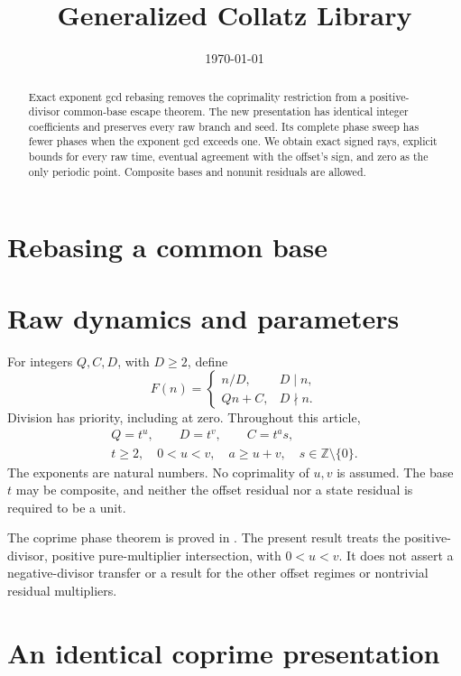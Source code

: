 \documentclass[11pt,letterpaper]{article}
\title{Generalized Collatz Library}
\author{}
\date{\today}
\newcommand{\Z}{\mathbb{Z}}
\begin{document}
\maketitle
\section*{Rebasing a common base}

\begin{abstract}
Exact exponent gcd rebasing removes the coprimality restriction from a
positive-divisor common-base escape theorem. The new presentation has identical
integer coefficients and preserves every raw branch and seed. Its complete
phase sweep has fewer phases when the exponent gcd exceeds one. We obtain
exact signed rays, explicit bounds for every raw time, eventual agreement with
the offset's sign, and zero as the only periodic point. Composite bases and
nonunit residuals are allowed.
\end{abstract}

\section{Raw dynamics and parameters}

For integers \(Q,C,D\), with \(D\ge2\), define
\[
F(n)=
\begin{cases}
n/D,&D\mid n,\\
Qn+C,&D\nmid n.
\end{cases}
\]
Division has priority, including at zero. Throughout this article,
\begin{equation}\label{Parameters}
\begin{gathered}
Q=t^u,\qquad D=t^v,\qquad C=t^a s,\\
t\ge2,\quad 0<u<v,\quad a\ge u+v,\quad s\in\Z\setminus\{0\}.
\end{gathered}
\end{equation}
The exponents are natural numbers. No coprimality of \(u,v\) is assumed.
The base \(t\) may be composite, and neither the offset residual nor a state
residual is required to be a unit.

The coprime phase theorem is proved in \cite{AscendCommonBase}.
The present result treats the positive-divisor, positive pure-multiplier
intersection, with \(0<u<v\). It does not assert a negative-divisor transfer
or a result for the other offset regimes or nontrivial residual multipliers.

\section{An identical coprime presentation}
\end{document}

